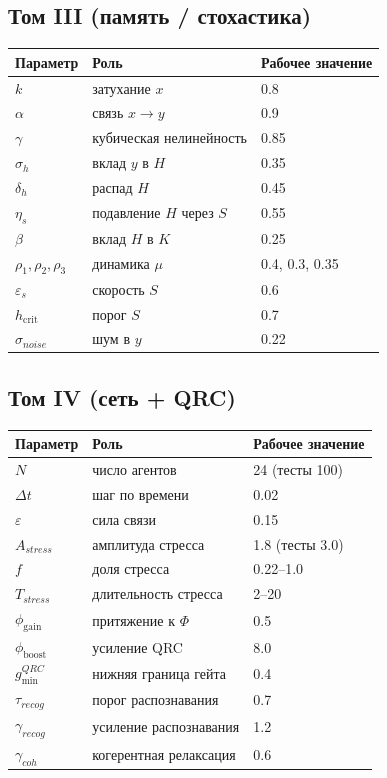\subsection*{Том III (память / стохастика)}
\begin{tabular}{lll}
\toprule
Параметр & Роль & Рабочее значение \\
\midrule
$k$ & затухание $x$ & 0.8 \\
$\alpha$ & связь $x\to y$ & 0.9 \\
$\gamma$ & кубическая нелинейность & 0.85 \\
$\sigma_h$ & вклад $y$ в $H$ & 0.35 \\
$\delta_h$ & распад $H$ & 0.45 \\
$\eta_s$ & подавление $H$ через $S$ & 0.55 \\
$\beta$ & вклад $H$ в $K$ & 0.25 \\
$\rho_1,\rho_2,\rho_3$ & динамика $\mu$ & 0.4, 0.3, 0.35 \\
$\varepsilon_s$ & скорость $S$ & 0.6 \\
$h_{\mathrm{crit}}$ & порог $S$ & 0.7 \\
$\sigma_{noise}$ & шум в $y$ & 0.22 \\
\bottomrule
\end{tabular}

\subsection*{Том IV (сеть + QRC)}
\begin{tabular}{lll}
\toprule
Параметр & Роль & Рабочее значение \\
\midrule
$N$ & число агентов & 24 (тесты 100) \\
$\Delta t$ & шаг по времени & 0.02 \\
$\varepsilon$ & сила связи & 0.15 \\
$A_{stress}$ & амплитуда стресса & 1.8 (тесты 3.0) \\
$f$ & доля стресса & 0.22--1.0 \\
$T_{stress}$ & длительность стресса & 2--20 \\
$\phi_{\mathrm{gain}}$ & притяжение к $\Phi$ & 0.5 \\
$\phi_{\mathrm{boost}}$ & усиление QRC & 8.0 \\
$g_{\min}^{QRC}$ & нижняя граница гейта & 0.4 \\
$\tau_{recog}$ & порог распознавания & 0.7 \\
$\gamma_{recog}$ & усиление распознавания & 1.2 \\
$\gamma_{coh}$ & когерентная релаксация & 0.6 \\
\bottomrule
\end{tabular}
